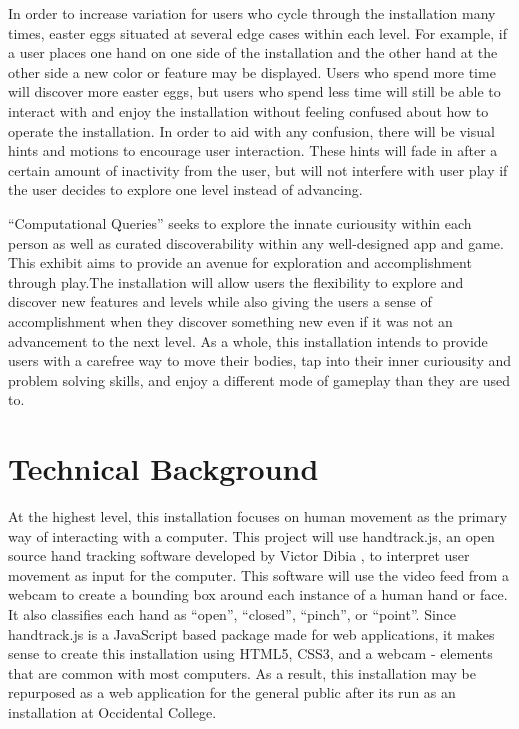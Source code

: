 \documentclass[10pt,twocolumn]{article}
\begin{document}
In order to increase variation for users who cycle through the installation many times, easter eggs situated at several edge cases within each level.  For example, if a user places one hand on one side of the installation and the other hand at the other side a new color or feature may be displayed.  Users who spend more time will discover more easter eggs, but users who spend less time will still be able to interact with and enjoy the installation without feeling confused about how to operate the installation.  In order to aid with any confusion, there will be visual hints and motions to encourage user interaction. These hints will fade in after a certain amount of inactivity from the user, but will not interfere with user play if the user decides to explore one level instead of advancing. 

``Computational Queries'' seeks to explore the innate curiousity within each person as well as curated discoverability within any well-designed app and game. This exhibit aims to provide an avenue for exploration and accomplishment through play.The installation will allow users the flexibility to explore and discover new features and levels while also giving the users a sense of accomplishment when they discover something new even if it was not an advancement to the next level. As a whole, this installation intends to provide users with a carefree way to move their bodies, tap into their inner curiousity and problem solving skills, and enjoy a different mode of gameplay than they are used to. 


\section{Technical Background}
At the highest level, this installation focuses on human movement as the primary way of interacting with a computer.  This project will use handtrack.js, an open source hand tracking software developed by Victor Dibia \cite{}, to interpret user movement as input for the computer.  This software will use the video feed from a webcam to create a bounding box around each instance of a human hand or face.  It also classifies each hand as ``open'', ``closed'', ``pinch'', or ``point''.  Since handtrack.js is a JavaScript based package made for web applications, it makes sense to create this installation using HTML5, CSS3, and a webcam - elements that are common with most computers.   As a result, this installation may be repurposed as a web application for the general public after its run as an installation at Occidental College. 
\end{document}
